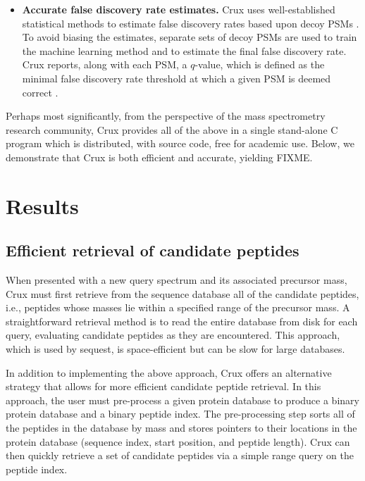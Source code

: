 \documentclass[12pt]{article}
\begin{document}
\begin{itemize}
\item {\bf Accurate false discovery rate estimates.}  Crux uses
  well-established statistical methods to estimate false discovery
  rates based upon decoy PSMs \cite{benjamini:controlling}.  To avoid
  biasing the estimates, separate sets of decoy PSMs are used to train
  the machine learning method and to estimate the final false
  discovery rate.  Crux reports, along with each PSM, a $q$-value,
  which is defined as the minimal false discovery rate threshold at
  which a given PSM is deemed correct \cite{storey:statistical}.

\end{itemize}

Perhaps most significantly, from the perspective of the mass
spectrometry research community, Crux provides all of the above in a
single stand-alone C program which is distributed, with source code,
free for academic use.  Below, we demonstrate that Crux is both
efficient and accurate, yielding FIXME.

\section{Results}

\subsection{Efficient retrieval of candidate peptides}

When presented with a new query spectrum and its associated precursor
mass, Crux must first retrieve from the sequence database all of the
candidate peptides, i.e., peptides whose masses lie within a specified
range of the precursor mass.  A straightforward retrieval method is to
read the entire database from disk for each query, evaluating
candidate peptides as they are encountered.  This approach, which is
used by {\sc sequest}, is space-efficient but can be slow for large
databases.

In addition to implementing the above approach, Crux offers an
alternative strategy that allows for more efficient candidate peptide
retrieval.  In this approach, the user must pre-process a given
protein database to produce a binary protein database and a binary
peptide index.  The pre-processing step sorts all of the peptides in
the database by mass and stores pointers to their locations in the
protein database (sequence index, start position, and peptide length).
Crux can then quickly retrieve a set of candidate peptides via a
simple range query on the peptide index.
\end{document}
